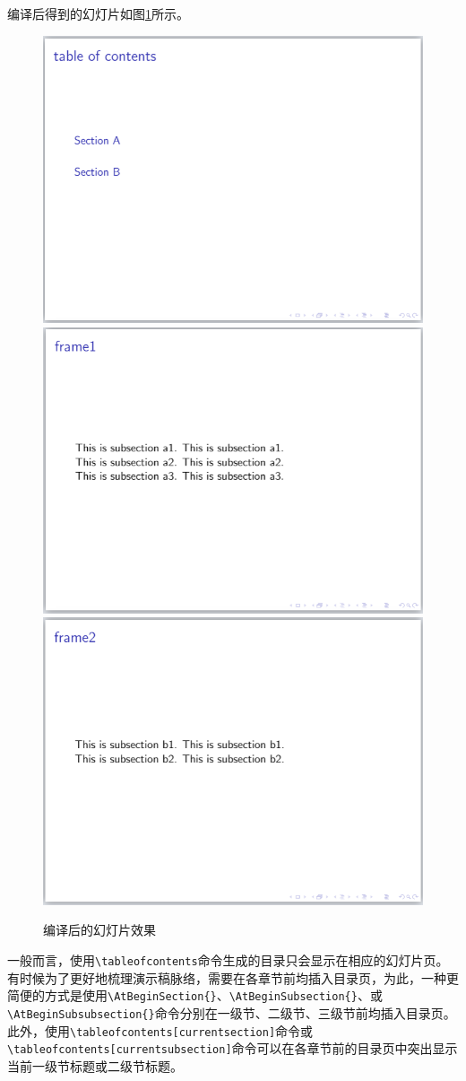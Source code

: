 编译后得到的幻灯片如图\ref{fig:907}所示。

\begin{figure}[htbp]
    \centering
    \includegraphics[width = 0.45\linewidth]{images/ch_9/NEWexample13_1.png}
    \includegraphics[width = 0.45\linewidth]{images/ch_9/NEWexample13_2.png}
    \includegraphics[width = 0.45\linewidth]{images/ch_9/NEWexample13_3.png}
    \caption{编译后的幻灯片效果}
    \label{fig:907}
\end{figure}

一般而言，使用\texttt{\textbackslash{}tableofcontents}命令生成的目录只会显示在相应的幻灯片页。有时候为了更好地梳理演示稿脉络，需要在各章节前均插入目录页，为此，一种更简便的方式是使用\texttt{\textbackslash{}AtBeginSection\{\}}、\texttt{\textbackslash{}AtBeginSubsection\{\}}、或\texttt{\textbackslash{}AtBeginSubsubsection\{\}}命令分别在一级节、二级节、三级节前均插入目录页。此外，使用\texttt{\textbackslash{}tableofcontents[currentsection]}命令或\texttt{\textbackslash{}tableofcontents[currentsubsection]}命令可以在各章节前的目录页中突出显示当前一级节标题或二级节标题。

